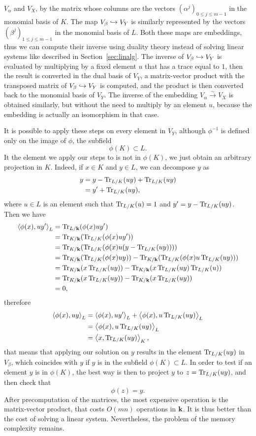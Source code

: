 $V_\alpha$ and $V_X$, by the matrix whose columns are the vectors
$(\alpha^j)_{0\leq j \leq m-1}$ in the monomial basis of $K$. The map
$V_\beta\hookrightarrow V_Y$ is similarly represented by the vectors
$(\beta^{j})_{1\leq j\leq m-1}$ in the monomial basis of $L$. Both these
maps are embeddings, thus we can compute their inverse using duality
theory instead of solving linear systems like described in
Section~\ref{sec:linalg}. The inverse of $V_\beta\hookrightarrow V_Y$ is evaluated by
multiplying by a fixed element $u$ that has a trace equal to $1$, then the
result is converted in the dual basis of $V_Y$, a matrix-vector product with the
transposed matrix of $V_\beta\hookrightarrow V_Y$ is computed, and the product is then
converted back to the monomial basis of $V_Y$. The inverse of the embedding
$V_\alpha\overset{\sim}{\to}V_X$ is obtained similarly, but without the need to
multiply by an element $u$, because the embedding is actually an isomorphism in
that case.

It is possible to apply these steps on every element in $V_Y$, although
$\phi^{-1}$ is defined only on the image of $\phi$, \ie the subfield
\[
  \phi(K)\subset L.
\]
It the element we apply our steps to is not in $\phi(K)$, we just obtain an
arbitrary projection in $K$. Indeed, if $x\in K$ and $y\in L$, we can decompose
$y$ as
\begin{align*}
  y &= y - \operatorname{Tr}_{L/K}(uy) + \operatorname{Tr}_{L/K}(uy)\\
  &= y' + \operatorname{Tr}_{L/K}(uy),
\end{align*}
where $u\in L$ is an element such that $\operatorname{Tr}_{L/K}(u)=1$ and
$y'=y-\operatorname{Tr}_{L/K}(uy)$. Then we have
\begin{align*}
  \left\langle\phi(x),uy'\right\rangle_L &= \operatorname{Tr}_{L/\mathbf{k}}(\phi(x)uy')\\
  &= \operatorname{Tr}_{K/\mathbf{k}}(\operatorname{Tr}_{L/K}(\phi(x)uy'))\\
  &= \operatorname{Tr}_{K/\mathbf{k}}(\operatorname{Tr}_{L/K}(\phi(x)u(y-\operatorname{Tr}_{L/K}(uy))))\\
  &=
  \operatorname{Tr}_{K/\mathbf{k}}(\operatorname{Tr}_{L/K}(\phi(x)uy))-\operatorname{Tr}_{K/\mathbf{k}}(\operatorname{Tr}_{L/K}(\phi(x)u\operatorname{Tr}_{L/K}(uy)))\\
  &= \operatorname{Tr}_{K/\mathbf{k}}(x\operatorname{Tr}_{L/K}(uy))-\operatorname{Tr}_{K/\mathbf{k}}(x\operatorname{Tr}_{L/K}(uy)\operatorname{Tr}_{L/K}(u))\\
  &= \operatorname{Tr}_{K/\mathbf{k}}(x\operatorname{Tr}_{L/K}(uy))-\operatorname{Tr}_{K/\mathbf{k}}(x\operatorname{Tr}_{L/K}(uy))\\
  &= 0,
\end{align*}
therefore
\begin{align*}
  \left\langle\phi(x),uy\right\rangle_L &= \left\langle\phi(x),uy'\right\rangle_L+\left\langle\phi(x),u\operatorname{Tr}_{L/K}(uy)\right\rangle_L\\
  &= \left\langle\phi(x),u\operatorname{Tr}_{L/K}(uy)\right\rangle_L\\
  &= \left\langle x,\operatorname{Tr}_{L/K}(uy)\right\rangle_K,
\end{align*}
that means that applying our solution on $y$ results in the element
$\operatorname{Tr}_{L/K}(uy)$ in $V_\beta$, which coincides with $y$ if $y$ is in the subfield
$\phi(K)\subset L$. In order to test if an element $y$ is in $\phi(K)$, the best
way is then to project $y$ to $z = \operatorname{Tr}_{L/K}(uy)$, and then check that
\[
  \phi(z) = y.
\]
After precomputation of the matrices, the most expensive operation is the
matrix-vector product, that costs $O(mn)$ operations in $\mathbf{k}$. It is thus better
than the cost of solving a linear system. Nevertheless, the problem of the memory
complexity remains.

